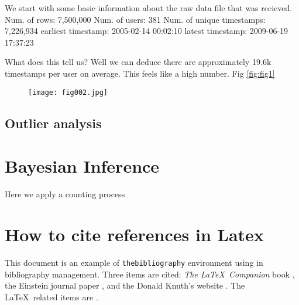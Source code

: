 We start with some basic information about the raw data file that was recieved. 
Num. of rows: 7,500,000
Num. of users: 381
Num. of unique timestamps: 7,226,934
earliest timestamp: 2005-02-14 00:02:10
latest timestamp: 2009-06-19 17:37:23

What does this tell us? Well we can deduce there are approximately 19.6k timestamps per user on average. This feels like a high number. Fig \ref{fig:fig1}

\begin{figure}[h!]
	\centering
	\texttt{[image: fig002.jpg]}
	\caption{}
	\label{fig:fig2}
\end{figure} 


\subsection{Outlier analysis} 


\section{Bayesian Inference}

Here we apply a counting process


\section{How to cite references in Latex}
\parencite{Reference1}

\medskip

This document is an example of \texttt{thebibliography} environment using 
in bibliography management. Three items are cited: \textit{The \LaTeX\ Companion} 
book \cite{latexcompanion}, the Einstein journal paper \cite{einstein}, and the 
Donald Knuth's website \cite{knuthwebsite}. The \LaTeX\ related items are
\cite{latexcompanion,knuthwebsite}. 

\medskip
